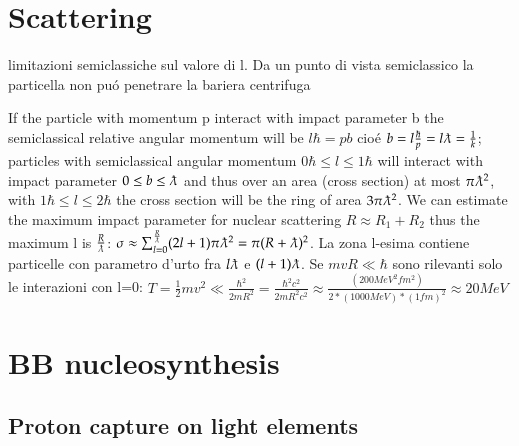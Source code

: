 \documentclass[main.tex]{subfiles}
\begin{document}
\chapter{Scattering}

limitazioni semiclassiche sul valore di l.
Da un punto di vista semiclassico la particella non pu\'o penetrare la bariera centrifuga
If the particle with momentum p interact with impact parameter b the semiclassical relative angular momentum will be $l\hbar=pb$ cio\'e $b=l\frac{\hbar}{p}=l\lambdabar=\frac{1}{k}$; particles with semiclassical angular momentum $0\hbar\leq l\leq1 \hbar$  will interact with impact parameter $0\leq b\leq \lambdabar$ and thus over an area (cross section) at most $\pi\lambdabar^2$, with $1\hbar\leq l\leq2\hbar$ the cross section will be the ring of area $3\pi\lambdabar^2$. We can estimate the maximum impact parameter for nuclear scattering $R\approx R_1+R_2$ thus the maximum l is $\frac{R}{\lambdabar}$: $\sigma\approx\sum_{l=0}^{\frac{R}{\lambdabar}}(2l+1)\pi\lambdabar^2=\pi(R+\lambdabar)^2$.
La zona l-esima contiene particelle con parametro d'urto fra $l\lambdabar$ e $(l+1)\lambdabar$. Se $mvR\ll\hbar$ sono rilevanti solo le interazioni con l=0: $T=\frac{1}{2}mv^2\ll\frac{\hbar^2}{2mR^2}=\frac{\hbar^2c^2}{2mR^2c^2}\approx\frac{(200 MeV^2 fm^2)}{2*(1000 MeV) *(1 fm)^2}\approx 20 MeV$

\chapter{BB nucleosynthesis}

\section{Proton capture on light elements}
\end{document}
